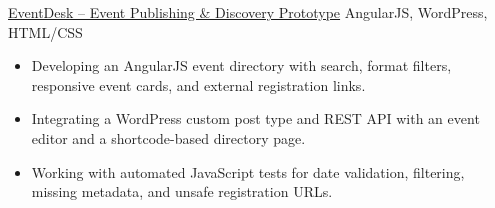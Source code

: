 \project
  {\href{https://github.com/kavyapokharel/EventDesk}
        {EventDesk -- Event Publishing \& Discovery Prototype}}
  {AngularJS, WordPress, HTML/CSS}
\begin{itemize}
  \item Developing an AngularJS event directory with search,
  format filters, responsive event cards, and external registration links.
  \item Integrating a WordPress custom post type and REST API
  with an event editor and a shortcode-based directory page.
  \item Working with automated JavaScript tests for date validation,
  filtering, missing metadata, and unsafe registration URLs.
\end{itemize}


